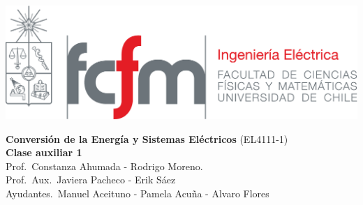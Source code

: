 \documentclass[
  11pt,
  letterpaper,
   addpoints,
  ]{exam}
\begin{document}
\noindent
\begin{minipage}{0.47\textwidth}
\includegraphics[width=\textwidth]{../fcfm_die}
\end{minipage}
\begin{minipage}{0.53\textwidth}
\begin{center} 
\large\textbf{Conversión de la Energía y Sistemas Eléctricos } (EL4111-1) \\
\large\textbf{Clase auxiliar 1} \\
\small Prof.~Constanza Ahumada - Rodrigo Moreno.\\
\small Prof.~Aux.~Javiera Pacheco - Erik Sáez\\
\small Ayudantes.~Manuel Aceituno - Pamela Acuña - Alvaro Flores\\
\end{center}
\end{minipage}

\vspace{0.5cm}
\noindent
\vspace{.85cm}
\end{document}
